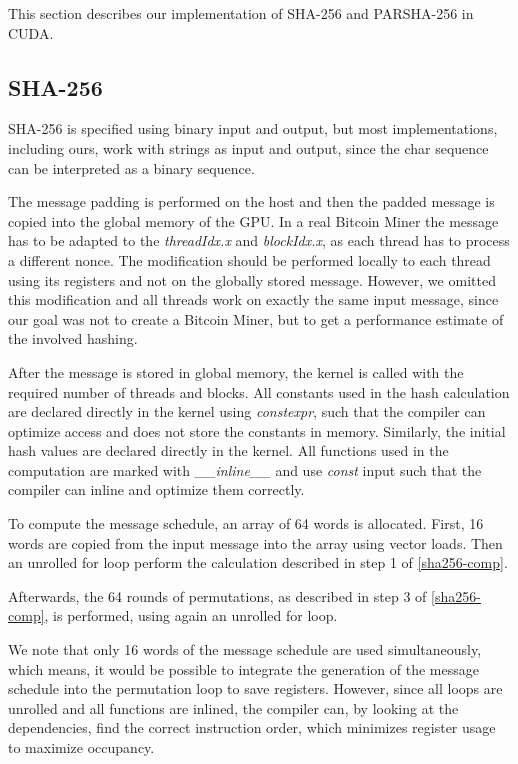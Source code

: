 \documentclass[letterpaper]{article}
\begin{document}
This section describes our implementation of SHA-256 and PARSHA-256 in CUDA.

\subsection{SHA-256}
SHA-256 is specified using binary input and output, but most implementations, including ours, work with strings as input and output, since the char sequence can be interpreted as a binary sequence. 

The message padding is performed on the host and then the padded message is copied into the global memory of the GPU. In a real Bitcoin Miner the message has to be adapted to the \emph{threadIdx.x} and \emph{blockIdx.x}, as each thread has to process a different nonce. The modification should be performed locally to each thread using its registers and not on the globally stored message. However, we omitted this modification and all threads work on exactly the same input message, since our goal was not to create a Bitcoin Miner, but to get a performance estimate of the involved hashing.

After the message is stored in global memory, the kernel is called with the required number of threads and blocks.
All constants used in the hash calculation are declared directly in the kernel using \emph{constexpr}, such that the compiler can optimize access and does not store the constants in memory. Similarly, the initial hash values are declared directly in the kernel. All functions used in the computation are marked with \emph{\_\_inline\_\_} and use \emph{const} input such that the compiler can inline and optimize them correctly.

To compute the message schedule, an array of 64 words is allocated. First, 16 words are copied from the input message into the array using vector loads. Then an unrolled for loop perform the calculation described in step 1 of \ref{sha256-comp}.

Afterwards, the 64 rounds of permutations, as described in step 3 of \ref{sha256-comp}, is performed, using again an unrolled for loop.

We note that only 16 words of the message schedule are used simultaneously, which means, it would be possible to integrate the generation of the message schedule into the permutation loop to save registers. However, since all loops are unrolled and all functions are inlined, the compiler can, by looking at the dependencies, find the correct instruction order, which minimizes register usage to maximize occupancy. 
\end{document}
